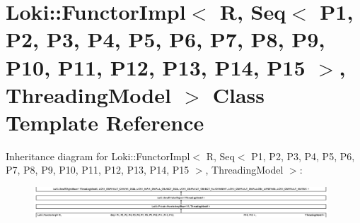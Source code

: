 \hypertarget{classLoki_1_1FunctorImpl_3_01R_00_01_01_01_01_01_01_01_01_01_01_01_01_01_01_01_01_01_01_01_01_01f3c1622f2ad04de036a5a92ca27f7142}{}\section{Loki\+:\+:Functor\+Impl$<$ R, Seq$<$ P1, P2, P3, P4, P5, P6, P7, P8, P9, P10, P11, P12, P13, P14, P15 $>$, Threading\+Model $>$ Class Template Reference}
\label{classLoki_1_1FunctorImpl_3_01R_00_01_01_01_01_01_01_01_01_01_01_01_01_01_01_01_01_01_01_01_01_01f3c1622f2ad04de036a5a92ca27f7142}
Inheritance diagram for Loki\+:\+:Functor\+Impl$<$ R, Seq$<$ P1, P2, P3, P4, P5, P6, P7, P8, P9, P10, P11, P12, P13, P14, P15 $>$, Threading\+Model $>$\+:\begin{figure}[H]
\begin{center}
\leavevmode
\includegraphics[height=1.139949cm]{classLoki_1_1FunctorImpl_3_01R_00_01_01_01_01_01_01_01_01_01_01_01_01_01_01_01_01_01_01_01_01_01f3c1622f2ad04de036a5a92ca27f7142}
\end{center}
\end{figure}
